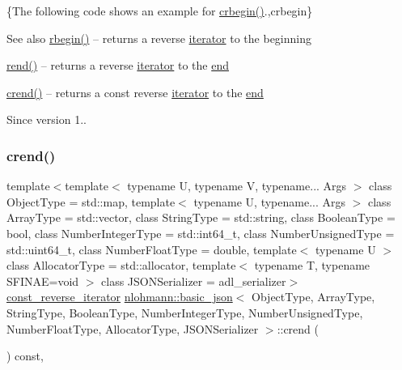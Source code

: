 \{The following code shows an example for {\ttfamily \mbox{\hyperlink{classnlohmann_1_1basic__json_a1e0769d22d54573f294da0e5c6abc9de}{crbegin()}}}.,crbegin\}

\begin{DoxySeeAlso}{See also}
\mbox{\hyperlink{classnlohmann_1_1basic__json_a1ef93e2006dbe52667294f5ef38b0b10}{rbegin()}} -- returns a reverse \mbox{\hyperlink{classnlohmann_1_1basic__json_a099316232c76c034030a38faa6e34dca}{iterator}} to the beginning 

\mbox{\hyperlink{classnlohmann_1_1basic__json_ac77aed0925d447744676725ab0b6d535}{rend()}} -- returns a reverse \mbox{\hyperlink{classnlohmann_1_1basic__json_a099316232c76c034030a38faa6e34dca}{iterator}} to the \mbox{\hyperlink{classnlohmann_1_1basic__json_a13e032a02a7fd8a93fdddc2fcbc4763c}{end}} 

\mbox{\hyperlink{classnlohmann_1_1basic__json_a5795b029dbf28e0cb2c7a439ec5d0a88}{crend()}} -- returns a const reverse \mbox{\hyperlink{classnlohmann_1_1basic__json_a099316232c76c034030a38faa6e34dca}{iterator}} to the \mbox{\hyperlink{classnlohmann_1_1basic__json_a13e032a02a7fd8a93fdddc2fcbc4763c}{end}}
\end{DoxySeeAlso}
\begin{DoxySince}{Since}
version 1.. 
\end{DoxySince}
\mbox{\label{classnlohmann_1_1basic__json_a5795b029dbf28e0cb2c7a439ec5d0a88}} 
\subsubsection{\texorpdfstring{crend()}{crend()}}
{\footnotesize\ttfamily template$<$template$<$ typename U, typename V, typename... Args $>$ class Object\+Type = std\+::map, template$<$ typename U, typename... Args $>$ class Array\+Type = std\+::vector, class String\+Type  = std\+::string, class Boolean\+Type  = bool, class Number\+Integer\+Type  = std\+::int64\+\_\+t, class Number\+Unsigned\+Type  = std\+::uint64\+\_\+t, class Number\+Float\+Type  = double, template$<$ typename U $>$ class Allocator\+Type = std\+::allocator, template$<$ typename T, typename S\+F\+I\+N\+A\+E=void $>$ class J\+S\+O\+N\+Serializer = adl\+\_\+serializer$>$ \\
\mbox{\hyperlink{classnlohmann_1_1basic__json_a72be3c24bfa24f0993d6c11af03e7404}{const\+\_\+reverse\+\_\+iterator}} \mbox{\hyperlink{classnlohmann_1_1basic__json}{nlohmann\+::basic\+\_\+json}}$<$ Object\+Type, Array\+Type, String\+Type, Boolean\+Type, Number\+Integer\+Type, Number\+Unsigned\+Type, Number\+Float\+Type, Allocator\+Type, J\+S\+O\+N\+Serializer $>$\+::crend (\begin{DoxyParamCaption}{ }\end{DoxyParamCaption}) const\hspace{0.3cm}{\ttfamily [inline]}, {\ttfamily [noexcept]}}



